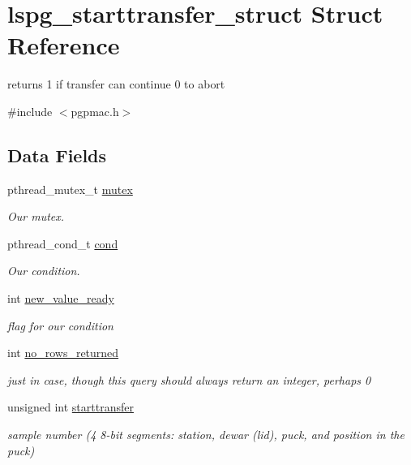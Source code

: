 \hypertarget{structlspg__starttransfer__struct}{\section{lspg\-\_\-starttransfer\-\_\-struct Struct Reference}
\label{structlspg__starttransfer__struct}
}


returns 1 if transfer can continue 0 to abort  




{\ttfamily \#include $<$pgpmac.\-h$>$}

\subsection*{Data Fields}
\begin{DoxyCompactItemize}
\item 
pthread\-\_\-mutex\-\_\-t \hyperlink{structlspg__starttransfer__struct_a47824bb2701a699d43a7a916e2010705}{mutex}
\begin{DoxyCompactList}\small\item\em Our mutex. \end{DoxyCompactList}\item 
pthread\-\_\-cond\-\_\-t \hyperlink{structlspg__starttransfer__struct_a1a569a2afabd7910219ff9d2d48c1b38}{cond}
\begin{DoxyCompactList}\small\item\em Our condition. \end{DoxyCompactList}\item 
int \hyperlink{structlspg__starttransfer__struct_ad3a6356e5ccce15c982ddecf9634999f}{new\-\_\-value\-\_\-ready}
\begin{DoxyCompactList}\small\item\em flag for our condition \end{DoxyCompactList}\item 
int \hyperlink{structlspg__starttransfer__struct_aa384ccd326d9247317f77072b93f94ca}{no\-\_\-rows\-\_\-returned}
\begin{DoxyCompactList}\small\item\em just in case, though this query should always return an integer, perhaps 0 \end{DoxyCompactList}\item 
unsigned int \hyperlink{structlspg__starttransfer__struct_af01b6bac6db9830719aef63e552312eb}{starttransfer}
\begin{DoxyCompactList}\small\item\em sample number (4 8-\/bit segments\-: station, dewar (lid), puck, and position in the puck) \end{DoxyCompactList}\end{DoxyCompactItemize}


